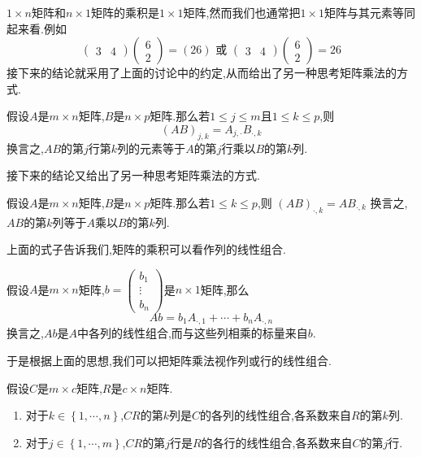 \documentclass{ctexart}
\begin{document}
$1\times n$矩阵和$n\times 1$矩阵的乘积是$1\times 1$矩阵,然而我们也通常把$1\times 1$矩阵与其元素等同起来看.例如
$$\begin{pmatrix}3 & 4\end{pmatrix}\begin{pmatrix}6\\2\end{pmatrix}=(26)\text{ 或 }\begin{pmatrix}3 & 4\end{pmatrix}\begin{pmatrix}6\\2\end{pmatrix}=26$$
接下来的结论就采用了上面的讨论中的约定,从而给出了另一种思考矩阵乘法的方式.
\begin{formal}[1.4 矩阵之积的元素等于行乘以列]
    假设$A$是$m\times n$矩阵,$B$是$n\times p$矩阵.那么若$1\leqslant j\leqslant m$且$1\leqslant k\leqslant p$,则
    $$(AB)_{j,k}=A_{j,\cdot}B_{\cdot,k}$$
    换言之,$AB$的第$j$行第$k$列的元素等于$A$的第$j$行乘以$B$的第$k$列.
\end{formal}\noindent
接下来的结论又给出了另一种思考矩阵乘法的方式.
\begin{formal}[1.5 矩阵之积的列等于矩阵与列之积]
    假设$A$是$m\times n$矩阵,$B$是$n\times p$矩阵.那么若$1\leqslant k\leqslant p$,则
    $(AB)_{\cdot,k}=AB_{\cdot,k}$
    换言之,$AB$的第$k$列等于$A$乘以$B$的第$k$列.
\end{formal}\noindent
上面的式子告诉我们,矩阵的乘积可以看作列的线性组合.
\begin{formal}[1.6 列的线性组合]
    假设$A$是$m\times n$矩阵,$b=\begin{pmatrix}b_1\\\vdots\\b_n\end{pmatrix}$是$n\times 1$矩阵,那么
    $$Ab=b_1A_{\cdot,1}+\cdots+b_nA_{\cdot,n}$$
    换言之,$Ab$是$A$中各列的线性组合,而与这些列相乘的标量来自$b$.
\end{formal}\noindent
于是根据上面的思想,我们可以把矩阵乘法视作列或行的线性组合.
\begin{formal}[1.7 将矩阵乘法视作列或行的线性组合]
    假设$C$是$m\times c$矩阵,$R$是$c\times n$矩阵.
    \begin{enumerate}[label=\tbf{(\alph*)}]
        \item 对于$k\in\left\{1,\cdots,n\right\}$,$CR$的第$k$列是$C$的各列的线性组合,各系数来自$R$的第$k$列.
        \item 对于$j\in\left\{1,\cdots,m\right\}$,$CR$的第$j$行是$R$的各行的线性组合,各系数来自$C$的第$j$行.
    \end{enumerate}
\end{formal}
\end{document}
